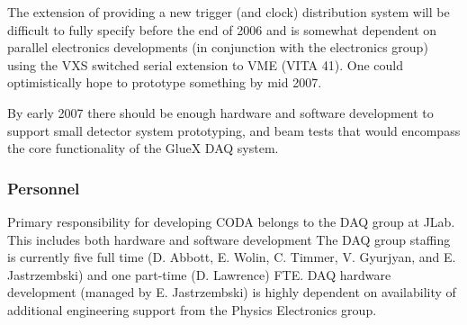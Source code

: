 \documentclass[10pt]{article}
\begin{document}
The extension of providing a new trigger (and clock) distribution system 
will be difficult to fully specify before the end of 2006 and is somewhat
dependent on parallel electronics developments (in conjunction with the
electronics group) using the VXS switched serial extension to VME (VITA 41). 
One could optimistically hope to prototype something by mid 2007.

By early 2007 there should be enough hardware and software development to
support small detector system prototyping, and beam tests that would
encompass the core functionality of the GlueX DAQ system. 


\subsubsection*{Personnel}

Primary responsibility for developing CODA belongs to the DAQ group at
JLab.  This includes both hardware and software development The DAQ group
staffing is currently five full time (D. Abbott, E. Wolin, C. Timmer,
V. Gyurjyan, and E. Jastrzembski) and one part-time (D. Lawrence) FTE. DAQ hardware
development (managed by E. Jastrzembski) is highly dependent on
availability of additional engineering support from the Physics Electronics group.
\end{document}
